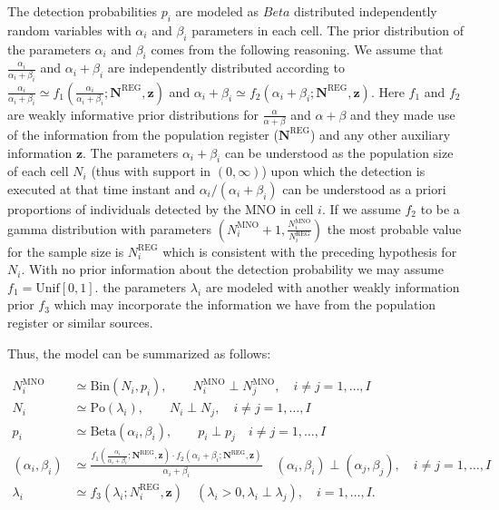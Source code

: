 \documentclass[12pt, a4paper]{article}
\begin{document}
The detection probabilities $p_{i}$ are modeled as $Beta$ distributed independently 
random variables with $\alpha_{i}$ and $\beta_{i}$ parameters in each cell. The prior 
distribution of the parameters $\alpha_{i}$ and $\beta_{i}$ comes from the following reasoning.
We assume that $\frac{\alpha_{i}}{\alpha_{i} + \beta_{i}}$ 
and $\alpha_{i} + \beta_{i}$ are independently distributed according 
to $\frac{\alpha_{i}}{\alpha_{i} + \beta_{i}}\simeq f_{1}(\frac{\alpha_{i}}{\alpha_{i}+\beta_{i}}; \mathbf{N}^{\textrm{REG}}, \mathbf{z})$   
and $\alpha_{i} + \beta_{i}\simeq f_{2}(\alpha_{i}+\beta_{i}; \mathbf{N}^{\textrm{REG}}, \mathbf{z})$.
Here  $f_{1}$ and $f_{2}$ are weakly informative prior distributions for $\frac{\alpha}{\alpha + \beta}$
and $\alpha + \beta$ and they made use of the information from the population 
register ($\mathbf{N}^{\textrm{REG}}$) and any other auxiliary information $\mathbf{z}$. 
The parameters $\alpha_{i}+\beta_{i}$ can be understood as the population size of 
each cell $N_{i}$ (thus with support in $(0,\infty)$) upon which the detection is executed 
at that time instant and $\alpha_{i}/(\alpha_{i}+\beta_{i})$ can be understood as a priori proportions 
of individuals detected by the MNO in cell $i$. 
If we assume $f_{2}$ to be a gamma distribution with parameters 
$(N_{i}^{\textrm{MNO}} + 1, \frac{N_{i}^{\textrm{MNO}}}{N_{i}^{\textrm{REG}}})$  the most probable 
value for the sample size is $N_{i}^{\textrm{REG}}$ which is consistent with the preceding hypothesis for $N_{i}$.
With no prior information about the detection probability we may assume $f_{1}=\textrm{Unif}[0,1]$.
the parameters $\lambda_{i}$ are modeled with another weakly information prior $f_{3}$ which may incorporate 
the information we have from the population register or similar sources.

Thus, the model can be summarized as follows:

\begin{align}\label{model1}
N_{i}^{\textrm{MNO}}&\simeq\textrm{Bin}\left(N_{i}, p_{i}\right),\qquad N_{i}^{\textrm{MNO}}\perp N_{j}^{\textrm{MNO}},\quad i\neq j=1,\dots,I\\
N_{i}&\simeq\textrm{Po}\left(\lambda_{i}\right),\qquad N_{i}\perp N_{j},\quad i\neq j=1,\dots,I\nonumber\\
p_{i}&\simeq\textrm{Beta}\left(\alpha_{i},\beta_{i}\right),\qquad p_{i}\perp p_{j}\quad i\neq j=1,\dots,I\nonumber\\
\left(\alpha_{i}, \beta_{i}\right)&\simeq \frac{f_{1}(\frac{\alpha_{i}}{\alpha_{i}+\beta_{i}}; \mathbf{N}^{\textrm{REG}}, \mathbf{z})\cdot f_{2}(\alpha_{i}+\beta_{i}; \mathbf{N}^{\textrm{REG}}, \mathbf{z})}{\alpha_{i}+\beta_{i}}\quad
(\alpha_{i},\beta_{i})\perp(\alpha_{j},\beta_{j}),\quad i\neq j=1,\dots,I\nonumber\\
\lambda_{i}&\simeq f_{3}(\lambda_{i}; N_{i}^{\textrm{REG}}, \mathbf{z})\quad (\lambda_{i} > 0, \lambda_{i}\perp\lambda_{j}), \quad i=1,\dots,I.\nonumber
\end{align}
\end{document}
